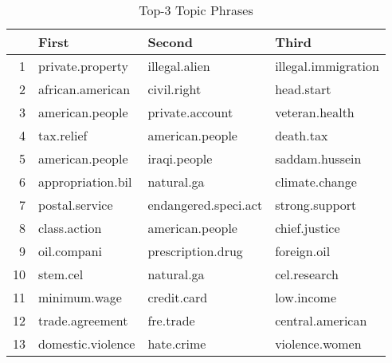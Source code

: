 \begin{table}[ht]
\centering
\begin{tabular}{rlll}
  \hline
 & First & Second & Third \\ 
  \hline
1 & private.property & illegal.alien & illegal.immigration \\ 
  2 & african.american & civil.right & head.start \\ 
  3 & american.people & private.account & veteran.health \\ 
  4 & tax.relief & american.people & death.tax \\ 
  5 & american.people & iraqi.people & saddam.hussein \\ 
  6 & appropriation.bil & natural.ga & climate.change \\ 
  7 & postal.service & endangered.speci.act & strong.support \\ 
  8 & class.action & american.people & chief.justice \\ 
  9 & oil.compani & prescription.drug & foreign.oil \\ 
  10 & stem.cel & natural.ga & cel.research \\ 
  11 & minimum.wage & credit.card & low.income \\ 
  12 & trade.agreement & fre.trade & central.american \\ 
  13 & domestic.violence & hate.crime & violence.women \\ 
   \hline
\end{tabular}
\caption{Top-3 Topic Phrases} 
\label{tab:tpcs3}
\end{table}
